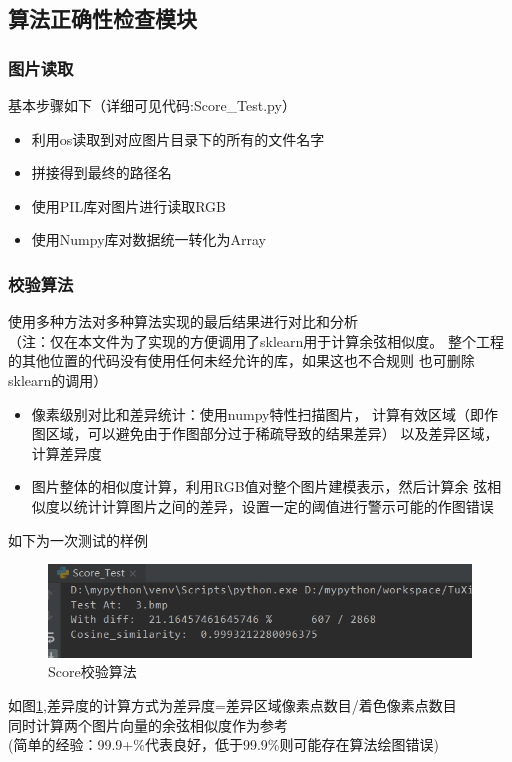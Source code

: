 \documentclass[a4paper,UTF8]{article}
\theoremstyle{definition}
\begin{document}
\subsection{算法正确性检查模块}
\subsubsection{图片读取}
基本步骤如下（详细可见代码:Score\_Test.py）

\begin{itemize}
    \item [(1)] 
    利用os读取到对应图片目录下的所有的文件名字
    \item [(2)]
    拼接得到最终的路径名
    \item [(3)]
    使用PIL库对图片进行读取RGB
    \item [(4)]
    使用Numpy库对数据统一转化为Array
  \end{itemize}

\subsubsection{校验算法}
使用多种方法对多种算法实现的最后结果进行对比和分析\\
（注：仅在本文件为了实现的方便调用了sklearn用于计算余弦相似度。
整个工程的其他位置的代码没有使用任何未经允许的库，如果这也不合规则
也可删除sklearn的调用）
\begin{itemize}
    \item 像素级别对比和差异统计：使用numpy特性扫描图片，
    计算有效区域（即作图区域，可以避免由于作图部分过于稀疏导致的结果差异）
    以及差异区域，计算差异度
    \item 图片整体的相似度计算，利用RGB值对整个图片建模表示，然后计算余
    弦相似度以统计计算图片之间的差异，设置一定的阈值进行警示可能的作图错误
\end{itemize}
如下为一次测试的样例\\

\begin{figure}[h]
	\centering
	\includegraphics[scale=0.6]{figure/test.png}
	\caption{Score校验算法}
	\label{fig:Score}
\end{figure}
如图\ref{fig:Score},差异度的计算方式为差异度=差异区域像素点数目/着色像素点数目\\
同时计算两个图片向量的余弦相似度作为参考\\
(简单的经验：99.9+\%代表良好，低于99.9\%则可能存在算法绘图错误)\\
\end{document}

